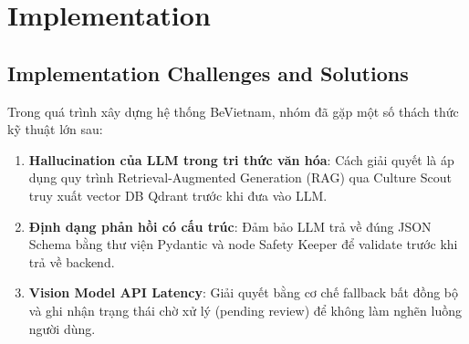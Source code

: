 \section{Implementation}

\subsection{Implementation Challenges and Solutions}

Trong quá trình xây dựng hệ thống BeVietnam, nhóm đã gặp một số thách thức kỹ thuật lớn sau:
\begin{enumerate}
    \item \textbf{Hallucination của LLM trong tri thức văn hóa}: Cách giải quyết là áp dụng quy trình Retrieval-Augmented Generation (RAG) qua Culture Scout truy xuất vector DB Qdrant trước khi đưa vào LLM.
    \item \textbf{Định dạng phản hồi có cấu trúc}: Đảm bảo LLM trả về đúng JSON Schema bằng thư viện Pydantic và node Safety Keeper để validate trước khi trả về backend.
    \item \textbf{Vision Model API Latency}: Giải quyết bằng cơ chế fallback bất đồng bộ và ghi nhận trạng thái chờ xử lý (pending review) để không làm nghẽn luồng người dùng.
\end{enumerate}
